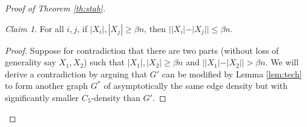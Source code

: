 \documentclass[12pt]{article}
\newcommand{\eps}{\epsilon}
\renewcommand{\a}{\alpha}
\renewcommand{\b}{\beta}
\theoremstyle{definition}
\theoremstyle{remark}
\newtheorem{claim}{Claim}[theorem]
\renewcommand{\ge}{\geqslant}
\renewcommand{\le}{\leqslant}
\begin{document}
\begin{proof}[Proof of Theorem \ref{th:stab}]
\begin{claim} \label{claim:balanced}
For all $i, j$, if $|X_i|, |X_j| \ge \b n$, then $||X_i| - |X_j|| \le \b n$.
\end{claim}
\begin{proof}
Suppose for contradiction that there are two parts (without loss of generality say $X_1, X_2$) such that $|X_1|, |X_2| \ge \b n$ and $||X_1| - |X_2|| > \b n$. 
We will derive a contradiction by arguing that $G'$ can be modified by Lemma \ref{lem:tech} to form another graph $G^*$ of asymptotically the same edge density but with significantly smaller $C_5$-density than $G'$. 
%



\end{proof}
\end{proof}
\end{document}
